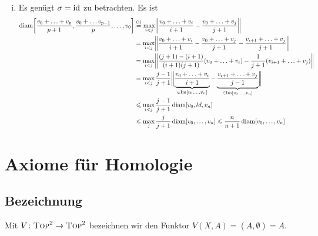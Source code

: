 \begin{enumerate}[(i)]
\begin{description}
	\end{description}
	\item Es genügt $\sigma=\operatorname{id}$ zu betrachten. Es ist 
	\begin{align*}
		\diam \benbrace*{\frac{v_0+ \ldots +v_p}{p+1}, \frac{v_0 + \ldots v_{p-1}}{p}, \ldots ,v_0} &\stackrel{\text{(i)}}{=} \max_{i <j}
		\norm{\frac{v_0+ \ldots +v_i}{i+1} - \frac{v_0 + \ldots + v_j}{j+1}}  \\
		&= \max_{i <j} \norm{\frac{v_0+ \ldots +v_i}{i+1} - \frac{v_0 + \ldots + v_j}{j+1} - \frac{v_{i+1}+ \ldots + v_j}{j+1}} \\
		&= \max_{i<j} \norm{\frac{(j+1)- (i+1)}{(i+1)(j+1)}(v_0 + \ldots + v_i) - \frac{1}{j+1} (v_{i+1} + \ldots +v_j)}  \\
		&= \max_{i<j} \frac{j-1}{j+1} \doppelstrich[\bigg]{\underbrace{\frac{v_0 + \ldots +v_i}{i+1}}_{\in \im [v_0, \ldots ,v_n]} - \underbrace{\frac{v_{i+1} + \ldots  + v_j}{j-1}}_{\in 
		\im [v_0, \ldots , v_n]}} \\
		&\le  \max_{i<j} \frac{j-1}{j+1} \diam [v_0, ld, v_n] \\
		&\le \max_j \frac{j}{j+1} \diam [v_0, \ldots ,v_n] \le \frac{n}{n+1} \diam [v_0, \ldots , v_n]   
	\end{align*}
\end{enumerate}
\newpage

\section{Axiome für Homologie} %
\label{sec:14}
\subsection[Bezeichnung: Funktor mit $(X,A) \mapsto (X,\emptyset)$]{Bezeichnung} %
\label{sub:141}
Mit $V \colon \textsc{Top}^2 \to \textsc{Top}^2$ bezeichnen wir den Funktor $V(X,A) = (A,\emptyset)=A$.

